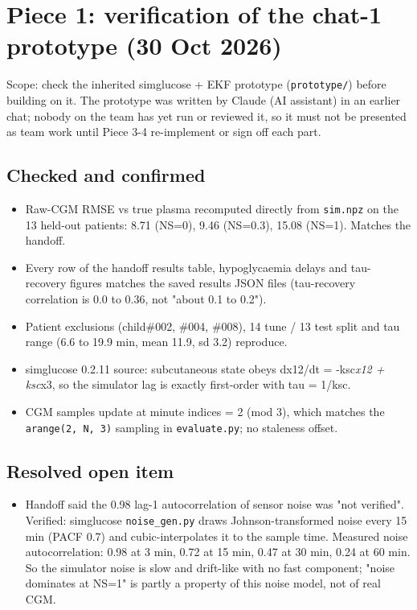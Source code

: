 \documentclass[11pt,a4paper]{article}
\providecommand{\tightlist}{\setlength{\itemsep}{0pt}\setlength{\parskip}{0pt}}
\begin{document}
\hypertarget{piece-1-verification-of-the-chat-1-prototype-30-oct-2026}{%
\section{Piece 1: verification of the chat-1 prototype (30 Oct
2026)}\label{piece-1-verification-of-the-chat-1-prototype-30-oct-2026}}

Scope: check the inherited simglucose + EKF prototype
(\texttt{prototype/}) before building on it. The prototype was written
by Claude (AI assistant) in an earlier chat; nobody on the team has yet
run or reviewed it, so it must not be presented as team work until Piece
3-4 re-implement or sign off each part.

\hypertarget{checked-and-confirmed}{%
\subsection{Checked and confirmed}\label{checked-and-confirmed}}

\begin{itemize}
\tightlist
\item
  Raw-CGM RMSE vs true plasma recomputed directly from \texttt{sim.npz}
  on the 13 held-out patients: 8.71 (NS=0), 9.46 (NS=0.3), 15.08 (NS=1).
  Matches the handoff.
\item
  Every row of the handoff results table, hypoglycaemia delays and
  tau-recovery figures matches the saved results JSON files
  (tau-recovery correlation is 0.0 to 0.36, not "about 0.1 to 0.2").
\item
  Patient exclusions (child\#002, \#004, \#008), 14 tune / 13 test split
  and tau range (6.6 to 19.9 min, mean 11.9, sd 3.2) reproduce.
\item
  simglucose 0.2.11 source: subcutaneous state obeys dx12/dt =
  -ksc\emph{x12 + ksc}x3, so the simulator lag is exactly first-order
  with tau = 1/ksc.
\item
  CGM samples update at minute indices = 2 (mod 3), which matches the
  \texttt{arange(2,\ N,\ 3)} sampling in \texttt{evaluate.py}; no
  staleness offset.
\end{itemize}

\hypertarget{resolved-open-item}{%
\subsection{Resolved open item}\label{resolved-open-item}}

\begin{itemize}
\tightlist
\item
  Handoff said the 0.98 lag-1 autocorrelation of sensor noise was "not
  verified". Verified: simglucose \texttt{noise\_gen.py} draws
  Johnson-transformed noise every 15 min (PACF 0.7) and
  cubic-interpolates it to the sample time. Measured noise
  autocorrelation: 0.98 at 3 min, 0.72 at 15 min, 0.47 at 30 min, 0.24
  at 60 min. So the simulator noise is slow and drift-like with no fast
  component; "noise dominates at NS=1" is partly a property of this
  noise model, not of real CGM.
\end{itemize}
\end{document}
